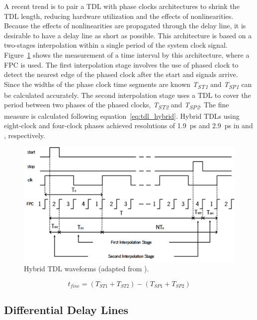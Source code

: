 A recent trend is to pair a \gls{TDL} with phase clocks architectures to shrink the \gls{TDL} length, reducing hardware utilization and the effects of nonlinearities. Because the effects of nonlinearities are propagated through the delay line, it is desirable to have a delay line as short as possible. This architecture is based on a two-stages interpolation within a single period of the system clock signal. Figure~\ref{fig:tld_bybrid_wf} shows the measurement of a time interval by this architecture, where a \gls{FPC} is used. The first interpolation stage involves the use of phased clock to detect the nearest edge of the phased clock after the start and signals arrive. Since the widths of the phase clock time segments are known \textit{T\textsubscript{ST1}} and \textit{T\textsubscript{SP1}} can be calculated accurately. The second interpolation stage uses a \gls{TDL} to cover the period between two phases of the phased clocks, \textit{T\textsubscript{ST2}} and \textit{T\textsubscript{SP2}}. The fine measure is calculated following equation~\ref{eq:tdl_hybrid}. Hybrid \glspl{TDL} using eight-clock and four-clock phases achieved resolutions of 1.9~ps and 2.9~ps in \citep{tdl_hyb_1.9} and \citep{tdl_hyb_2.9}, respectively.

\begin{figure}[ht!]
	\centering
	\includegraphics[width=.7\textwidth]{img/02_StateofArt/tld_hybrid_wf.png}
	\caption{Hybrid TDL waveforms (adapted from \citep{tdl_hyb_2.9}).}
	\label{fig:tld_bybrid_wf}
\end{figure}

\begin{equation}
	t_{fine} = (T_{ST1} + T_{ST2}) - (T_{SP1} + T_{SP2})
	\label{eq:tdl_hybrid}
\end{equation}


\subsection{Differential Delay Lines} %
\label{sub:differential_delay_lines}

